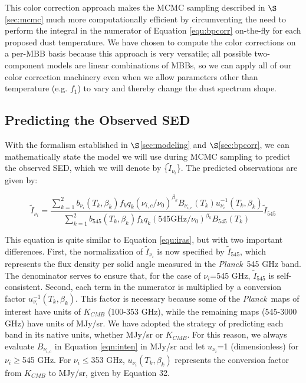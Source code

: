 \documentclass{emulateapj}
\newcommand{\IRAS}{{\it IRAS}}
\newcommand{\PLANCK}{{\it Planck}}
\begin{document}

This color correction approach makes the MCMC sampling described in 
$\S$\ref{sec:mcmc} much more computationally efficient by circumventing the 
need to perform the integral in the numerator of Equation \ref{equ:bpcorr} 
on-the-fly for each proposed dust temperature. We have chosen to compute the 
color corrections on a per-MBB basis because this approach is very 
versatile; all possible two-component models are linear combinations of MBBs, 
so we can apply all of our color correction machinery even when we allow 
parameters other than temperature (e.g. $f_1$) to vary and thereby change the 
dust spectrum shape.


\subsection{Predicting the Observed SED}
With the formalism established in $\S$\ref{sec:modeling} and 
$\S$\ref{sec:bpcorr}, we can mathematically state the model we will use during 
MCMC sampling to predict the observed SED, which we will denote by 
\{$\tilde{I}_{\nu_i}$\}. The predicted observations are given by:

\begin{equation}
\label{eqn:inten}
\tilde{I}_{\nu_i} = \frac{\sum\limits_{k=1}^{2} b_{\nu_i}(T_k, \beta_k) f_k q_k (\nu_{i,c}/\nu_0)^{\beta_k} B_{\nu_{i,c}}(T_k) u_{\nu_i}^{-1}(T_k, \beta_k)}{\sum\limits_{k=1}^{2} b_{545}(T_k, \beta_k) f_k q_k (545 \textrm{GHz}/\nu_0)^{\beta_k} B_{545}(T_k)}\tilde{I}_{545}
\end{equation}

This equation is quite similar to Equation \ref{equ:iras}, but with two 
important differences. First, the normalization of $\tilde{I}_{\nu_i}$ is now 
specified by $\tilde{I}_{545}$, which represents the flux density per solid
angle measured in the \PLANCK~545 GHz band. The denominator serves to ensure 
that, for the case of $\nu_i$=545 GHz, $\tilde{I}_{545}$ is self-consistent. 
Second, each term in the numerator is multiplied by a conversion factor 
$u_{\nu_i}^{-1}(T_k, \beta_k)$. This factor is necessary because some of the 
\PLANCK~maps of interest have units of $K_{CMB}$ (100-353 GHz), while the
remaining maps (545-3000 GHz) have units of MJy/sr. We have adopted the 
strategy of predicting each band in its native units, whether MJy/sr or 
$K_{CMB}$. For this reason, we always evaluate $B_{\nu_{i,c}}$ in Equation 
\ref{eqn:inten} in MJy/sr and let $u_{\nu_i}$=1 (dimensionless) for 
$\nu_i$$\ge$545 GHz. For $\nu_i$$\le$353 GHz, $u_{\nu_i}(T_k, \beta_k)$ 
represents the conversion factor from $K_{CMB}$ to MJy/sr, given by 
\cite{planckresponse} Equation 32.
\end{document}
